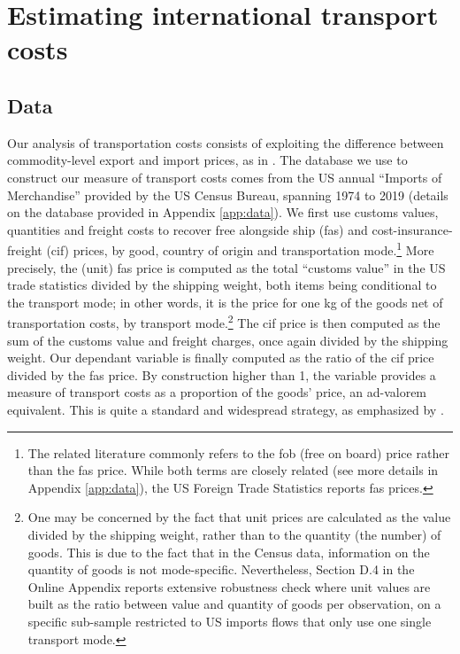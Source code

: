 \documentclass[a4paper,11pt]{article}
\begin{document}
\section{Estimating international transport costs\label{sec:data_method}}

\subsection{Data}

Our analysis of transportation costs consists of exploiting the difference between commodity-level export and import prices, as in \cite{hummels2007}. The database we use to construct our measure of transport costs comes from the US annual ``Imports of Merchandise'' provided by the US Census Bureau, spanning 1974 to 2019 (details on the database provided in Appendix \ref{app:data}). We first use customs values, quantities and freight costs to recover free alongside ship (fas) and cost-insurance-freight (cif) prices, by good, country of origin and transportation mode.\footnote{The related literature commonly refers to the fob (free on board) price rather than the fas price. While both terms are closely related (see more details in Appendix \ref{app:data}), the US Foreign Trade Statistics reports fas prices.} More precisely, the (unit) fas price is computed as the total ``customs value'' in the US trade statistics divided by the shipping weight, both items being conditional to the transport mode; in other words, it is the price for one kg of the goods net of transportation costs, by transport mode.\footnote{One may be concerned by the fact that unit prices are calculated as the value divided by the shipping weight, rather than to the quantity (the number) of goods. This is due to the fact that in the Census data, information on the quantity of goods is not mode-specific. Nevertheless, Section D.4 in the Online Appendix reports extensive robustness check where unit values are built as the ratio between value and quantity of goods per observation, on a specific sub-sample restricted to US imports flows that only use one single transport mode. %
}
The cif price is then computed as the sum of the customs value and freight charges, once again divided by the shipping weight. Our dependant variable is finally computed as the ratio of the cif price divided by the fas price. By construction higher than 1, the variable provides a measure of transport costs as a proportion of the goods' price, an ad-valorem equivalent. This is quite a standard and widespread strategy, as emphasized by \cite{anderson_wincoop_jel}.
\end{document}
